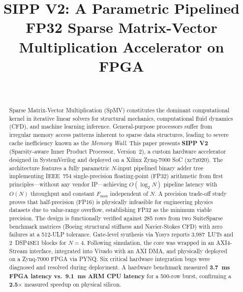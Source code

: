 \documentclass[journal,a4paper]{IEEEtran}
\begin{document}
\title{\textbf{SIPP V2}: A Parametric Pipelined FP32 Sparse Matrix-Vector
Multiplication Accelerator on FPGA}

\author{%
  \\
}

\maketitle

\begin{abstract}
Sparse Matrix-Vector Multiplication (SpMV) constitutes the dominant
computational kernel in iterative linear solvers for structural mechanics,
computational fluid dynamics (CFD), and machine learning inference.
General-purpose processors suffer from irregular memory access patterns
inherent to sparse data structures, leading to severe cache inefficiency
known as the \emph{Memory Wall}.
This paper presents \textbf{SIPP V2} (Sparsity-aware Inner Product
Processor, Version~2), a custom hardware accelerator designed in
SystemVerilog and deployed on a Xilinx Zynq-7000 SoC (xc7z020).
The architecture features a fully parametric $N$-input pipelined binary
adder tree implementing IEEE~754 single-precision floating-point (FP32)
arithmetic from first principles---without any vendor IP---achieving
$O(\log_2 N)$ pipeline latency with $O(N)$ throughput and constant
$F_{\max}$ independent of $N$.
A precision trade-off study proves that half-precision (FP16) is
physically infeasible for engineering physics datasets due to value-range
overflow, establishing FP32 as the minimum viable precision.
The design is functionally verified against 285 rows from two SuiteSparse
benchmark matrices (Boeing structural stiffness and Navier-Stokes CFD)
with zero failures at a 512-ULP tolerance.
Gate-level synthesis via Yosys reports 3,987~LUTs and 2~DSP48E1 blocks
for $N=4$.
Following simulation, the core was wrapped in an AXI4-Stream interface,
integrated into Vivado with an AXI DMA, and physically deployed on a
Zynq-7000 FPGA via PYNQ. Six critical hardware integration bugs were
diagnosed and resolved during deployment.
A hardware benchmark measured \textbf{3.7~ms FPGA latency vs.\
9.1~ms ARM CPU latency} for a 500-row burst, confirming a
\textbf{2.5$\times$} measured speedup on physical silicon.
\end{abstract}
\end{document}
